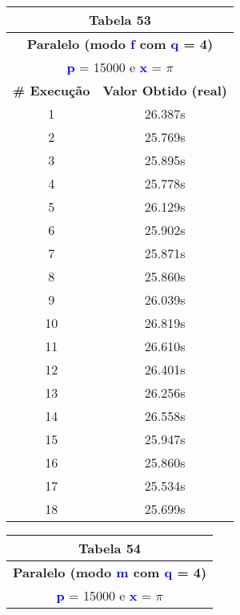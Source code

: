 \documentclass[11pt]{article}
\begin{document}
\begin{table}[!h]
	\begin{center}
		\begin{minipage}{0.48\textwidth}
			\begin{tabular}{| c | c |}
			\hline
			\multicolumn{2}{|c|}{\textbf{Tabela 53}} \\ \hline
			\multicolumn{2}{|c|}{\textbf{Paralelo (modo \textbf{\textcolor{blue}{f}} com \textbf{\textcolor{blue}{q}} = 4)}} \\
			\multicolumn{2}{|c|}{\textbf{\textcolor{blue}{p}} = 15000 e \textbf{\textcolor{blue}{x}} = $\pi$} \\ [0.2ex]
			\hline
				\textbf{\# Execução} &  \textbf{Valor Obtido (real)} \\ \hline
				1 & 26.387s \\ \hline
				2 & 25.769s \\ \hline
				3 & 25.895s \\ \hline
				4 & 25.778s \\ \hline
				5 & 26.129s \\ \hline
				6 & 25.902s \\ \hline
				7 & 25.871s \\ \hline
				8 & 25.860s \\ \hline
				9 & 26.039s \\ \hline
				10 & 26.819s \\ \hline
				11 & 26.610s \\ \hline
				12 & 26.401s \\ \hline
				13 & 26.256s \\ \hline
				14 & 26.558s \\ \hline
				15 & 25.947s \\ \hline
				16 & 25.860s \\ \hline
				17 & 25.534s \\ \hline
				18 & 25.699s \\ \hline
			\end{tabular}
		\end{minipage}
		\begin{minipage}{0.48\textwidth}
			\begin{tabular}{| c | c |}
			\hline
			\multicolumn{2}{|c|}{\textbf{Tabela 54}} \\ \hline
			\multicolumn{2}{|c|}{\textbf{Paralelo (modo \textbf{\textcolor{blue}{m}} com \textbf{\textcolor{blue}{q}} = 4)}} \\
			\multicolumn{2}{|c|}{\textbf{\textcolor{blue}{p}} = 15000 e \textbf{\textcolor{blue}{x}} = $\pi$} \\ [0.2ex]

\end{tabular}
\end{minipage}
\end{center}
\end{table}
\end{document}
